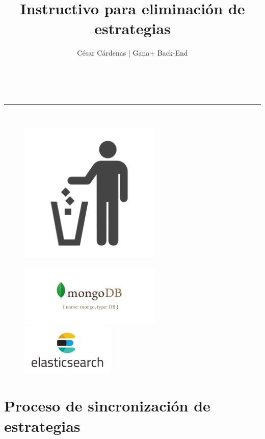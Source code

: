 \documentclass[a4paper,11pt]{paper}
\makeatletter
\newcommand{\linia}{\rule{\linewidth}{0.5pt}}
\renewcommand{\maketitle}{
\begin{center}
\vspace{2ex}
{\huge \textsc{\@title}}
\vspace{1ex}
\\
\linia\\
\@author \hfill \@date
\vspace{4ex}
\end{center}
}
\makeatother
\begin{document}
\title{Instructivo para eliminación de estrategias}

\author{César Cárdenas | Gana+ Back-End}

\date{}
\maketitle
\vspace*{\fill}
\begin{figure}[!h]
\centering
\includegraphics[width=0.6\textwidth]{imgs/logo.png}
\end{figure}

\begin{figure}[!h]
\includegraphics[width=0.60\textwidth]{imgs/Mongo.png}
\includegraphics[width=0.40\textwidth]{imgs/Elasticsearch.png}
\end{figure}
\vspace*{\fill}

\newpage
\tableofcontents
\newpage
{}


\section{Proceso de sincronización de estrategias}
\end{document}
